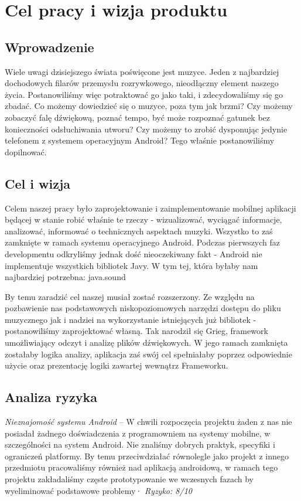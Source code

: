 \chapter{Cel pracy i wizja produktu}

\section{Wprowadzenie}
Wiele uwagi dzisiejszego świata poświęcone jest muzyce. Jeden z najbardziej dochodowych filarów przemysłu rozrywkowego, nieodłączny element naszego życia. Postanowiliśmy więc potraktować go jako taki, i zdecydowaliśmy się go zbadać. Co możemy dowiedzieć się o muzyce, poza tym jak brzmi? Czy możemy zobaczyć falę dźwiękową, poznać tempo, być może rozpoznać gatunek bez konieczności odsłuchiwania utworu? Czy możemy to zrobić dysponując jedynie telefonem z systemem operacyjnym Android? Tego właśnie postanowiliśmy dopilnować.
\section{Cel i wizja}
Celem naszej pracy było zaprojektowanie i zaimplementowanie mobilnej aplikacji będącej w stanie robić właśnie te rzeczy - wizualizować, wyciągać informacje, analizować, informować o technicznych aspektach muzyki. Wszystko to zaś zamknięte w ramach systemu operacyjnego Android. Podczas pierwszych faz developmentu odkryliśmy jednak dość nieoczekiwany fakt - Android nie implementuje wszystkich bibliotek Javy. W tym tej, która byłaby nam najbardziej potrzebna: java.sound

By temu zaradzić cel naszej musiał zostać rozszerzony. Ze względu na pozbawienie nas podstawowych niskopoziomowych narzędzi dostępu do pliku muzycznego jak i nadziei na wykorzystanie istniejących już bibliotek - postanowiliśmy zaprojektować własną. Tak narodził się Grieg, framework umożliwiający odczyt i analizę plików dźwiękowych. W jego ramach zamknięta zostałaby logika analizy, aplikacja zaś swój cel spełniałaby poprzez odpowiednie użycie oraz prezentację logiki zawartej wewnątrz Frameworku.

\section{Analiza ryzyka}

\noindent\emph{Nieznajomość systemu Android} -- W chwili rozpoczęcia projektu żaden z nas nie posiadał żadnego doświadczenia z programowniem na systemy mobilne, w szczególności na system Android. Nie znaliśmy dobrych praktyk, specyfiki i ograniczeń platformy. By temu przeciwdziałać równolegle jako projekt z innego przedmiotu pracowaliśmy również nad aplikacją androidową, w ramach tego projektu zakładaliśmy częste prototypowanie we wczesnych fazach by wyeliminować podstawowe problemy· \emph{Ryzyko: 8/10}

